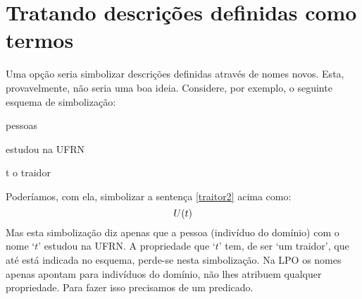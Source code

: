 \section[Descrições definidas como termos]{Tratando descrições definidas como termos}
Uma opção seria simbolizar descrições definidas através de nomes novos. Esta, provavelmente, não seria uma boa ideia.
Considere, por exemplo, o seguinte esquema de simbolização:
\begin{center}
	\begin{ekey}
		\item[\text{domínio}] pessoas
		\item[\atom{U}{x}]  estudou na UFRN
		\item[t] o traidor
	\end{ekey}
\end{center}
Poderíamos, com ela, simbolizar a sentença \ref{traitor2} acima como:
$$\mathord{U}(t)$$
Mas esta simbolização diz apenas que a pessoa (indivíduo do domínio) com o nome `$t$' estudou na UFRN.
A propriedade que `$t$' tem, de ser `um traidor', que até está indicada no esquema, perde-se nesta simbolização.
Na LPO os nomes apenas apontam para indivíduos do domínio, não lhes atribuem qualquer propriedade.
Para fazer isso precisamos de um predicado.

